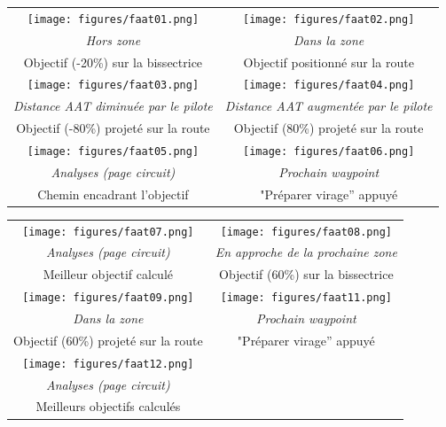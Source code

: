 \begin{maxipage}
\begin{center}
\begin{longtable}{|c|c|}
\toprule
\texttt{[image: figures/faat01.png]} &
\texttt{[image: figures/faat02.png]} \\
{\em Hors zone} & {\em Dans la zone} \\
Objectif (-20\%) sur la bissectrice & Objectif positionné sur la route \\

\midrule
\texttt{[image: figures/faat03.png]} &
\texttt{[image: figures/faat04.png]} \\
{\em Distance AAT diminuée par le pilote} & {\em Distance AAT augmentée par le pilote} \\
Objectif (-80\%) projeté sur la route & Objectif (80\%) projeté sur la route \\

\midrule
\texttt{[image: figures/faat05.png]} &
\texttt{[image: figures/faat06.png]} \\
{\em Analyses (page circuit)} & {\em Prochain waypoint} \\
Chemin encadrant l'objectif  & "Préparer virage'' appuyé \\
\bottomrule
\end{longtable}
\end{center}
\end{maxipage}

\begin{maxipage}
\begin{center}
\begin{longtable}{|c|c|}
\toprule
\texttt{[image: figures/faat07.png]} &
\texttt{[image: figures/faat08.png]} \\
{\em Analyses (page circuit)} & {\em En approche de la prochaine zone} \\
Meilleur objectif calculé & Objectif (60\%) sur la bissectrice \\

\midrule
\texttt{[image: figures/faat09.png]} &
\texttt{[image: figures/faat11.png]} \\
{\em Dans la zone} & {\em Prochain waypoint} \\
Objectif (60\%) projeté sur la route & "Préparer virage'' appuyé \\

\midrule
\texttt{[image: figures/faat12.png]} &  \\
{\em Analyses (page circuit)} &  \\
Meilleurs objectifs calculés &  \\

\bottomrule
\end{longtable}
\end{center}
\end{maxipage}

